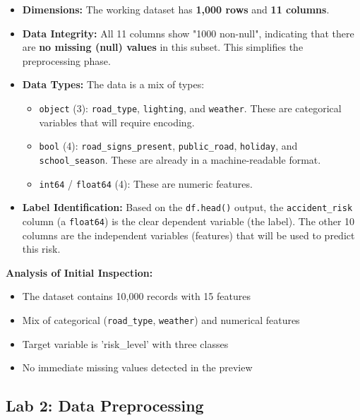 \documentclass[12pt,a4paper]{article}
\begin{document}
\begin{itemize}
    \item \textbf{Dimensions:} The working dataset has \textbf{1,000 rows} and \textbf{11 columns}.
    \item \textbf{Data Integrity:} All 11 columns show "1000 non-null", indicating that there are \textbf{no missing (null) values} in this subset. This simplifies the preprocessing phase.
    \item \textbf{Data Types:} The data is a mix of types:
        \begin{itemize}
            \item \texttt{object} (3): \texttt{road\_type}, \texttt{lighting}, and \texttt{weather}. These are categorical variables that will require encoding.
            \item \texttt{bool} (4): \texttt{road\_signs\_present}, \texttt{public\_road}, \texttt{holiday}, and \texttt{school\_season}. These are already in a machine-readable format.
            \item \texttt{int64} / \texttt{float64} (4): These are numeric features.
        \end{itemize}
    \item \textbf{Label Identification:} Based on the \texttt{df.head()} output, the \texttt{accident\_risk} column (a \texttt{float64}) is the clear dependent variable (the label). The other 10 columns are the independent variables (features) that will be used to predict this risk.
\end{itemize}

\begin{infobox}
\textbf{Analysis of Initial Inspection:}
\begin{itemize}
     \item The dataset contains 10,000 records with 15 features
     \item Mix of categorical (\texttt{road\_type}, \texttt{weather}) and numerical features
     \item Target variable is 'risk\_level' with three classes
     \item No immediate missing values detected in the preview
\end{itemize}
\end{infobox}


\subsection{Lab 2: Data Preprocessing}
\end{document}
